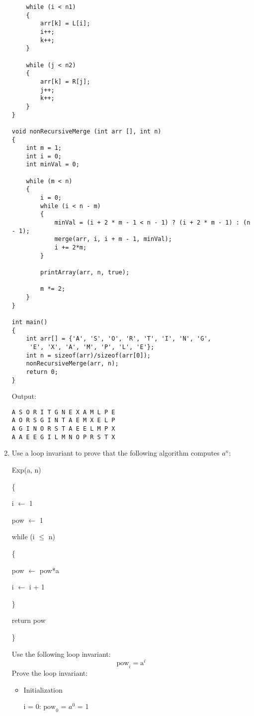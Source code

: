 \documentclass[11pts]{report}
\begin{document}
\begin{enumerate}
\begin{lstlisting}
    while (i < n1) 
    { 
        arr[k] = L[i]; 
        i++; 
        k++; 
    } 
  
    while (j < n2) 
    { 
        arr[k] = R[j]; 
        j++; 
        k++; 
    } 
} 

void nonRecursiveMerge (int arr [], int n)
{
    int m = 1;
    int i = 0;
    int minVal = 0;

    while (m < n)
    {
        i = 0;
        while (i < n - m)
        {
            minVal = (i + 2 * m - 1 < n - 1) ? (i + 2 * m - 1) : (n - 1);
            merge(arr, i, i + m - 1, minVal);
            i += 2*m;
        }

        printArray(arr, n, true);

        m *= 2;
    }
}

int main()
{
    int arr[] = {'A', 'S', 'O', 'R', 'T', 'I', 'N', 'G',
     'E', 'X', 'A', 'M', 'P', 'L', 'E'};
    int n = sizeof(arr)/sizeof(arr[0]);
    nonRecursiveMerge(arr, n);
    return 0;
}
\end{lstlisting}


Output:
\begin{lstlisting}
A S O R I T G N E X A M L P E 
A O R S G I N T A E M X E L P 
A G I N O R S T A E E L M P X 
A A E E G I L M N O P R S T X
\end{lstlisting}


\item Use a loop invariant to prove that the following algorithm computes $a^n$:

\par Exp(a, n)
\par \{
\par \qquad i $\gets$ 1
\par \qquad pow $\gets$ 1
\par \qquad while (i $\leq$ n)
\par \qquad \{
\par \qquad \qquad pow $\gets$ pow*a
\par \qquad \qquad i $\gets$ i + 1
\par \qquad \}
\par \qquad return pow
\par \}

\par Use the following loop invariant:
\begin{equation*}
\text{pow}_i = \text{a}^i
\end{equation*}
Prove the loop invariant:

\begin{itemize}
\item Initialization
\par i = 0: $\text{pow}_0$ = $a^0$ = 1


\end{itemize}
\end{enumerate}
\end{document}
